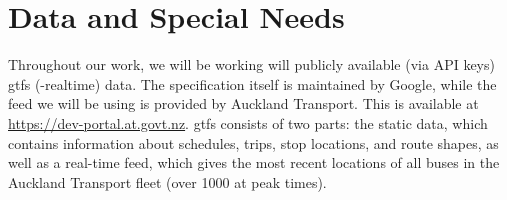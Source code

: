\documentclass[12pt,a4paper]{article}
\begin{document}
\section{Data and Special Needs}
\label{sec:data}























Throughout our work, we will be working will publicly available (via API keys) \gls{gtfs}
(-realtime) data.
The specification itself is maintained by Google, 
while the feed we will be using is provided by Auckland Transport.
This is available at \url{https://dev-portal.at.govt.nz}.
\gls{gtfs} consists of two parts:
the static data, which contains information about schedules, trips, stop locations,
and route shapes, as well as a real-time feed, which gives the most recent locations
of all buses in the Auckland Transport fleet (over 1000 at peak times).
\end{document}
